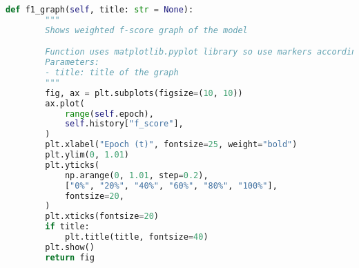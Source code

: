 \begin{lstlisting}[language = python]
    def f1_graph(self, title: str = None):
        """
        Shows weighted f-score graph of the model

        Function uses matplotlib.pyplot library so use markers according to matplotlib.pyplot library
        Parameters:
        - title: title of the graph
        """
        fig, ax = plt.subplots(figsize=(10, 10))
        ax.plot(
            range(self.epoch),
            self.history["f_score"],
        )
        plt.xlabel("Epoch (t)", fontsize=25, weight="bold")
        plt.ylim(0, 1.01)
        plt.yticks(
            np.arange(0, 1.01, step=0.2),
            ["0%", "20%", "40%", "60%", "80%", "100%"],
            fontsize=20,
        )
        plt.xticks(fontsize=20)
        if title:
            plt.title(title, fontsize=40)
        plt.show()
        return fig

        \end{lstlisting}



